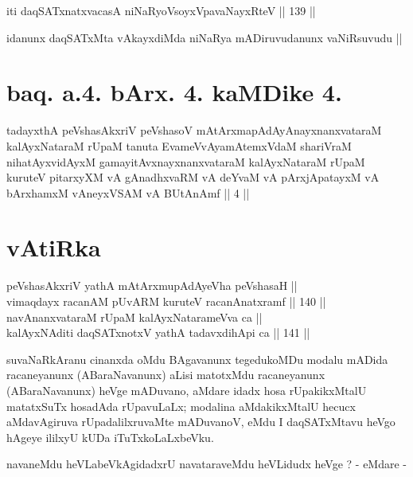 
\begin{shl}
iti daqSATxnatxvacasA niNaRyoV\s soyxVpavaNayxRteV \hfill || 139 ||
\end{shl}

\begin{artha}
idanunx daqSATxMta vAkayxdiMda niNaRya mADiruvudanunx vaNiRsuvudu ||
\end{artha}

\section*{baq. a.4. bArx. 4. kaMDike 4.}

\begin{shl}
tadayxthA peVshasAkxriV peVshasoV mAtArxmapAdAyAnayxnanxvataraM kalAyxNataraM rUpaM tanuta EvameVvAyamAtemxVdaM shariVraM nihatAyxvidAyxM gamayitAvxnayxnanxvataraM kalAyxNataraM rUpaM kuruteV pitarxyXM vA gAnadhxvaRM vA deYvaM vA pArxjApatayxM vA bArxhamxM vAneyxVSAM vA BUtAnAmf || 4 ||
\end{shl}

\section*{vAtiRka}

\begin{shl}
peVshasAkxriV yathA mAtArxmupAdAyeVha peVshasaH || \\
vimaqdayx racanAM pUvARM kuruteV racanAnatxramf \hfill || 140 ||  \\
navAnanxvataraM rUpaM kalAyxNatarameVva ca || \\
kalAyxNAditi daqSATxnotxV yathA tadavxdihApi ca \hfill || 141 ||  
\end{shl}

\begin{artha}
suvaNaRkAranu cinanxda oMdu BAgavanunx tegedukoMDu modalu mADida
racaneyanunx (ABaraNavanunx) aLisi matotxMdu racaneyanunx
(ABaraNavanunx) heVge mADuvano, aMdare idadx hosa rUpakikxMtalU
matatxSuTx hosadAda rUpavuLaLx; modalina aMdakikxMtalU hecucx
aMdavAgiruva rUpadalilxruvaMte mADuvanoV, eMdu I daqSATxMtavu heVgo
hAgeye ililxyU kUDa iTuTxkoLaLxbeVku.
\end{artha}

\begin{artha}
navaneMdu heVLabeVkAgidadxrU navataraveMdu heVLidudx heVge ? - eMdare -
\end{artha}

